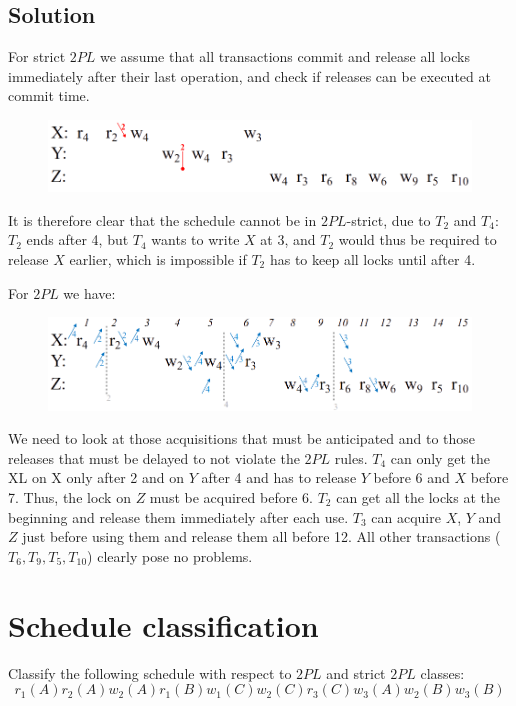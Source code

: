 \documentclass[12pt, a4paper]{report}
\newtheorem[style=M,bodystyle=\normalfont]{theorem}{Theorem}
\newtheorem[style=M,bodystyle=\normalfont]{corollary}{Corollary}
\newtheorem[style=M,bodystyle=\normalfont]{lemma}{Lemma}
\newtheorem[style=M,bodystyle=\normalfont]{definition}{Definition}
\begin{document}
    \subsection*{Solution}
        For strict $2PL$ we assume that all transactions commit and release all locks immediately after their last operation, and check if releases can be executed at commit time.
        \begin{figure}[H]
            \centering
            \includegraphics[width=1\linewidth]{images/2PL3.png}
        \end{figure}
        It is therefore clear that the schedule cannot be in $2PL$-strict, due to $T_2$ and $T_4$: $T_2$ ends after 4, but $T_4$ wants to write $X$ at 3, and $T_2$ would thus be 
        required to release $X$ earlier, which is impossible if $T_2$ has to keep all locks until after 4.

        For $2PL$ we have: 
        \begin{figure}[H]
            \centering
            \includegraphics[width=1\linewidth]{images/2PL4.png}
        \end{figure}
        We need to look at those acquisitions that must be anticipated and to those releases that must be delayed to not violate the $2PL$ rules.
        $T_4$ can only get the XL on X only after 2 and on $Y$ after 4 and has to release $Y$ before 6 and $X$ before 7. Thus, the lock on $Z$ must be acquired before 6.
        $T_2$ can get all the locks at the beginning and release them immediately after each use. $T_3$ can acquire $X$, $Y$ and $Z$ just before using them and release them all before 12. 
        All other transactions ($T_6, T_9, T_5, T_10$) clearly pose no problems.

    \newpage

    \section{Schedule classification}
        Classify the following schedule with respect to $2PL$ and strict $2PL$ classes: 
        \[r_1(A) r_2(A) w_2(A) r_1(B) w_1(C) w_2(C) r_3(C) w_3(A) w_2(B) w_3(B)\]
\end{document}
